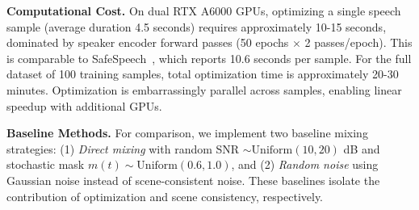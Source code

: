 \textbf{Computational Cost.}
On dual RTX A6000 GPUs, optimizing a single speech sample (average duration 4.5 seconds) requires approximately 10-15 seconds, dominated by speaker encoder forward passes (50 epochs $\times$ 2 passes/epoch). This is comparable to SafeSpeech~\citep{safespeech}, which reports 10.6 seconds per sample. For the full dataset of 100 training samples, total optimization time is approximately 20-30 minutes. Optimization is embarrassingly parallel across samples, enabling linear speedup with additional GPUs.

\textbf{Baseline Methods.}
For comparison, we implement two baseline mixing strategies: (1) \textit{Direct mixing} with random SNR $\sim \text{Uniform}(10, 20)$ dB and stochastic mask $m(t) \sim \text{Uniform}(0.6, 1.0)$, and (2) \textit{Random noise} using Gaussian noise instead of scene-consistent noise. These baselines isolate the contribution of optimization and scene consistency, respectively.
